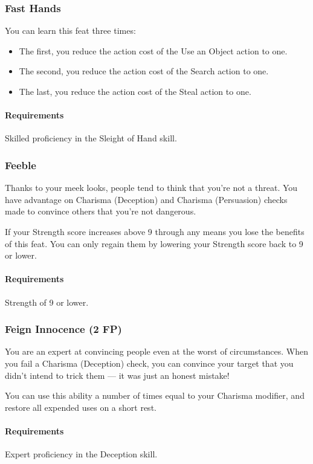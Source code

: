\subsubsection{Fast Hands} \label{feat::fasthands}
    You can learn this feat three times:
    \begin{itemize}
        \item The first, you reduce the action cost of the Use an Object action to one.
        \item The second, you reduce the action cost of the Search action to one.
        \item The last, you reduce the action cost of the Steal action to one.
    \end{itemize}
    \paragraph{Requirements} Skilled proficiency in the Sleight of Hand skill.
\subsubsection{Feeble} \label{feat::feeble}
    Thanks to your meek looks, people tend to think that you're not a threat.
    You have advantage on Charisma (Deception) and Charisma (Persuasion) checks made to convince others that you're not dangerous.

    If your Strength score increases above 9 through any means you lose the benefits of this feat.
    You can only regain them by lowering your Strength score back to 9 or lower.
    \paragraph{Requirements} Strength of 9 or lower.
\subsubsection{Feign Innocence (2 FP)} \label{feat::feigninnocence}
    You are an expert at convincing people even at the worst of circumstances.
    When you fail a Charisma (Deception) check, you can convince your target that you didn't intend to trick them --- it was just an honest mistake!

    You can use this ability a number of times equal to your Charisma modifier, and restore all expended uses on a short rest.
    \paragraph{Requirements} Expert proficiency in the Deception skill.
